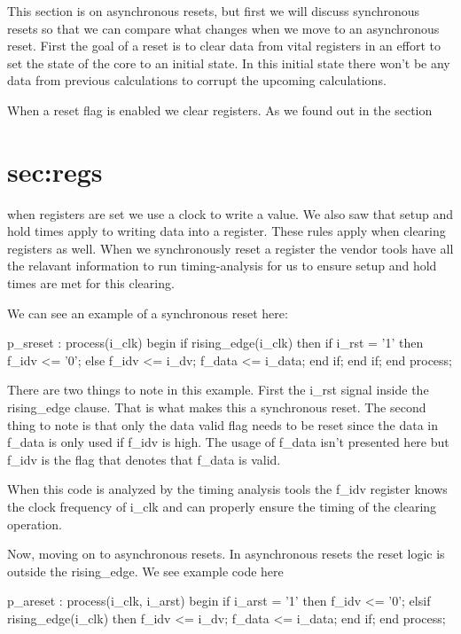 This section is on asynchronous resets, but first we will discuss synchronous resets so that we can compare what changes when we move to an asynchronous reset. First the goal of a reset is to clear data from vital registers in an effort to set the state of the core to an initial state. In this initial state there won't be any data from previous calculations to corrupt the upcoming calculations. 

When a reset flag is enabled we clear registers. As we found out in the section \section{sec:regs} when registers are set we use a clock to write a value. We also saw that setup and hold times apply to writing data into a register. These rules apply when clearing registers as well. When we synchronously reset a register the vendor tools have all the relavant information to run timing-analysis for us to ensure setup and hold times are met for this clearing. 

We can see an example of a synchronous reset here:

\begin{VHDLlisting}[tabsize=8]
p_sreset : process(i_clk)
begin
	if rising_edge(i_clk) then
		if i_rst = '1' then
			f_idv <= '0';
		else
			f_idv <= i_dv;
			f_data <= i_data;		
		end if;	
	end if;
end process;
\end{VHDLlisting}

There are two things to note in this example. First the i\_rst signal inside the rising\_edge clause. That is what makes this a synchronous reset. The second thing to note is that only the data valid flag needs to be reset since the data in f\_data is only used if f\_idv is high. The usage of f\_data isn't presented here but f\_idv is the flag that denotes that f\_data is valid. 

When this code is analyzed by the timing analysis tools the f\_idv register knows the clock frequency of i\_clk and can properly ensure the timing of the clearing operation. 

Now, moving on to asynchronous resets. In asynchronous resets the reset logic is outside the rising\_edge. We see example code here

\begin{VHDLlisting}[tabsize=8]
p_areset : process(i_clk, i_arst)
begin
	if i_arst = '1' then
		f_idv <= '0';
	elsif rising_edge(i_clk) then
		f_idv <= i_dv;
		f_data <= i_data;		
	end if;
end process;
\end{VHDLlisting}

